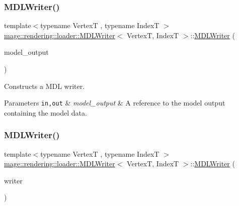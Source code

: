 \subsubsection{\texorpdfstring{M\+D\+L\+Writer()}{MDLWriter()}\hspace{0.1cm}{\footnotesize\ttfamily [1/3]}}
{\footnotesize\ttfamily template$<$typename VertexT , typename IndexT $>$ \\
\mbox{\hyperlink{classmage_1_1rendering_1_1loader_1_1_m_d_l_writer}{mage\+::rendering\+::loader\+::\+M\+D\+L\+Writer}}$<$ VertexT, IndexT $>$\+::\mbox{\hyperlink{classmage_1_1rendering_1_1loader_1_1_m_d_l_writer}{M\+D\+L\+Writer}} (\begin{DoxyParamCaption}\item[{const \mbox{\hyperlink{structmage_1_1rendering_1_1_model_output}{Model\+Output}}$<$ VertexT, IndexT $>$ \&}]{model\+\_\+output }\end{DoxyParamCaption})\hspace{0.3cm}{\ttfamily [explicit]}}

Constructs a M\+DL writer.


\begin{DoxyParams}[1]{Parameters}
\mbox{\tt in,out}  & {\em model\+\_\+output} & A reference to the model output containing the model data. \\
\hline
\end{DoxyParams}
\mbox{\label{classmage_1_1rendering_1_1loader_1_1_m_d_l_writer_a475ff3efdba707303052bae28d3ba85b}} 
\subsubsection{\texorpdfstring{M\+D\+L\+Writer()}{MDLWriter()}\hspace{0.1cm}{\footnotesize\ttfamily [2/3]}}
{\footnotesize\ttfamily template$<$typename VertexT , typename IndexT $>$ \\
\mbox{\hyperlink{classmage_1_1rendering_1_1loader_1_1_m_d_l_writer}{mage\+::rendering\+::loader\+::\+M\+D\+L\+Writer}}$<$ VertexT, IndexT $>$\+::\mbox{\hyperlink{classmage_1_1rendering_1_1loader_1_1_m_d_l_writer}{M\+D\+L\+Writer}} (\begin{DoxyParamCaption}\item[{const \mbox{\hyperlink{classmage_1_1rendering_1_1loader_1_1_m_d_l_writer}{M\+D\+L\+Writer}}$<$ VertexT, IndexT $>$ \&}]{writer }\end{DoxyParamCaption})\hspace{0.3cm}{\ttfamily [delete]}}

